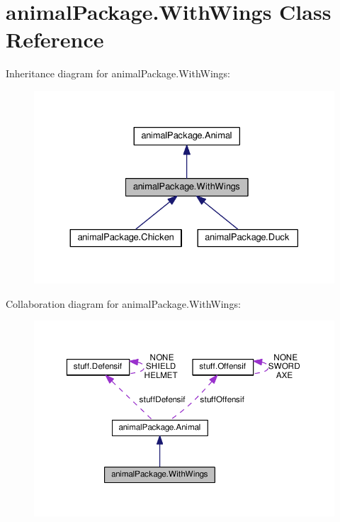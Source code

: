 \hypertarget{classanimal_package_1_1_with_wings}{}\section{animal\+Package.\+With\+Wings Class Reference}
\label{classanimal_package_1_1_with_wings}


Inheritance diagram for animal\+Package.\+With\+Wings\+:\nopagebreak
\begin{figure}[H]
\begin{center}
\leavevmode
\includegraphics[width=330pt]{classanimal_package_1_1_with_wings__inherit__graph}
\end{center}
\end{figure}


Collaboration diagram for animal\+Package.\+With\+Wings\+:\nopagebreak
\begin{figure}[H]
\begin{center}
\leavevmode
\includegraphics[width=350pt]{classanimal_package_1_1_with_wings__coll__graph}
\end{center}
\end{figure}
